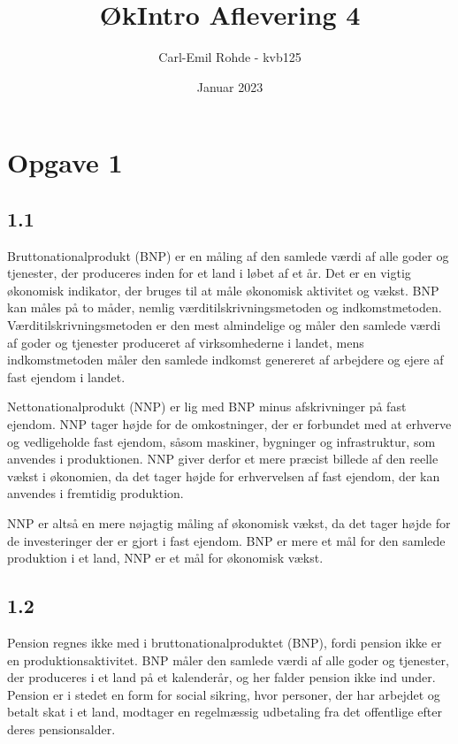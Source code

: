 \documentclass{article}
\begin{document}
\title{ØkIntro Aflevering 4}
\author{Carl-Emil Rohde - kvb125}
\date{Januar 2023}
\maketitle

\section*{Opgave 1}
\subsection*{1.1}
Bruttonationalprodukt (BNP) er en måling af den samlede værdi af alle goder og tjenester, der produceres inden for et land i løbet af et år. Det er en vigtig økonomisk indikator, der bruges til at måle økonomisk aktivitet og vækst. BNP kan måles på to måder, nemlig værditilskrivningsmetoden og indkomstmetoden. Værditilskrivningsmetoden er den mest almindelige og måler den samlede værdi af goder og tjenester produceret af virksomhederne i landet, mens indkomstmetoden måler den samlede indkomst genereret af arbejdere og ejere af fast ejendom i landet.

Nettonationalprodukt (NNP) er lig med BNP minus afskrivninger på fast ejendom. NNP tager højde for de omkostninger, der er forbundet med at erhverve og vedligeholde fast ejendom, såsom maskiner, bygninger og infrastruktur, som anvendes i produktionen. NNP giver derfor et mere præcist billede af den reelle vækst i økonomien, da det tager højde for erhvervelsen af fast ejendom, der kan anvendes i fremtidig produktion.

NNP er altså en mere nøjagtig måling af økonomisk vækst, da det tager højde for de investeringer der er gjort i fast ejendom. BNP er mere et mål for den samlede produktion i et land, NNP er et mål for økonomisk vækst.

\subsection*{1.2}
Pension regnes ikke med i bruttonationalproduktet (BNP), fordi pension ikke er en produktionsaktivitet. BNP måler den samlede værdi af alle goder og tjenester, der produceres i et land på et kalenderår, og her falder pension ikke ind under. Pension er i stedet en form for social sikring, hvor personer, der har arbejdet og betalt skat i et land, modtager en regelmæssig udbetaling fra det offentlige efter deres pensionsalder.
\end{document}
